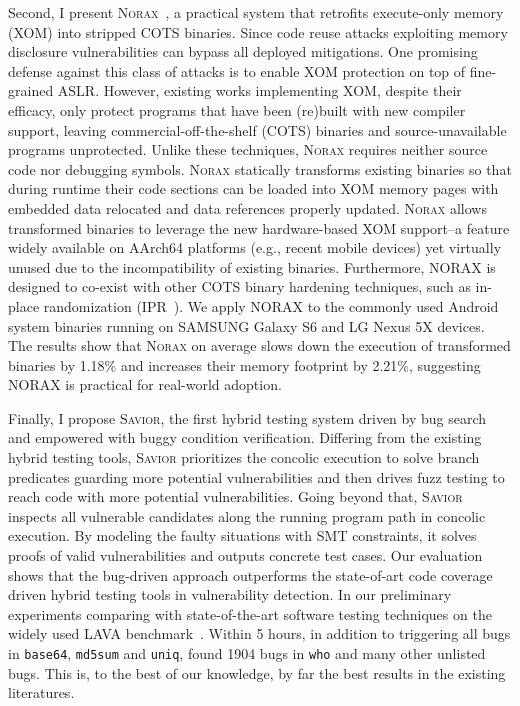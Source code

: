 Second, I present \textsc {Norax}~\cite{norax}, a practical system that retrofits execute-only memory (XOM) into stripped COTS binaries. Since code reuse attacks exploiting memory disclosure vulnerabilities can bypass all deployed mitigations. One promising defense against this class of attacks is to enable XOM protection on top of fine-grained ASLR. However, existing works implementing XOM, despite their efficacy, only protect programs that have been (re)built with new compiler support, leaving commercial-off-the-shelf (COTS) binaries and source-unavailable programs unprotected.  Unlike these techniques, \textsc {Norax} requires neither source code nor debugging symbols. \textsc {Norax} statically transforms existing binaries so that during runtime their code sections can be loaded into XOM memory pages with embedded data relocated and data references properly updated. \textsc {Norax} allows transformed binaries to leverage the new hardware-based XOM support--a feature widely available on AArch64 platforms (e.g., recent mobile devices) yet virtually unused due to the incompatibility of existing binaries. Furthermore, NORAX is designed to co-exist with other COTS binary hardening techniques, such as in-place randomization (IPR~\cite{ipr}). We apply NORAX to the commonly used Android system binaries running on SAMSUNG Galaxy S6 and LG Nexus 5X devices. The results show that \textsc {Norax} on average slows down the execution of transformed binaries by 1.18\% and increases their memory footprint by 2.21\%, suggesting NORAX is practical for real-world adoption.

Finally, I propose \textsc {Savior}, the first hybrid testing system driven by bug search and empowered with buggy condition verification. Differing from the
existing hybrid testing tools, \textsc {Savior} prioritizes the concolic execution to solve branch predicates guarding more potential 
vulnerabilities and then drives fuzz testing to reach code with more potential vulnerabilities. Going beyond that, \textsc {Savior} inspects all vulnerable 
candidates along the running program path in concolic execution. By modeling the faulty situations with SMT constraints, it solves proofs 
of valid vulnerabilities and outputs concrete test cases. Our evaluation shows that the bug-driven approach outperforms the state-of-art 
code coverage driven hybrid testing tools in vulnerability detection. In our preliminary experiments comparing \savior with state-of-the-art software testing techniques on the widely used LAVA benchmark~\cite{lava}. Within 5 hours, in addition to triggering all bugs in {\tt base64}, {\tt md5sum} and {\tt uniq}, \savior found 1904 bugs in {\tt who} and many other unlisted bugs. This is, to the best of our knowledge, by far the best results in the existing literatures.


